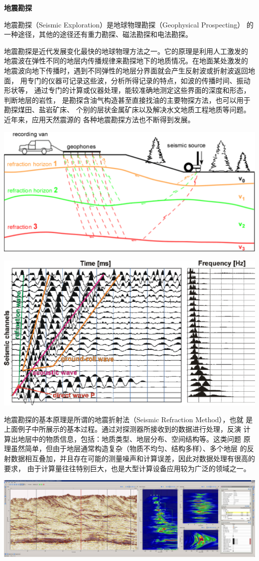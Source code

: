 \begin{shaded}
	{\bf 地震勘探}
	
	地震勘探（Seismic Exploration）是地球物理勘探（Geophysical Prospecting）
	的一种途径，其他的途径还有重力勘探、磁法勘探和电法勘探。
	
	地震勘探是近代发展变化最快的地球物理方法之一。它的原理是利用人工激发的
	地震波在弹性不同的地层内传播规律来勘探地下的地质情况。在地面某处激发的
	地震波向地下传播时，遇到不同弹性的地层分界面就会产生反射波或折射波返回地面，
	用专门的仪器可记录这些波，分析所得记录的特点，如波的传播时间、振动形状等，
	通过专门的计算或仪器处理，能较准确地测定这些界面的深度和形态，判断地层的岩性，
	是勘探含油气构造甚至直接找油的主要物探方法，也可以用于勘探煤田、盐岩矿床、
	个别的层状金属矿床以及解决水文地质工程地质等问题。近年来，应用天然震源的
	各种地震勘探方法也不断得到发展。
	
	\begin{center}
		\includegraphics[width=.6\textwidth]{./images/ch3/RS-reality.pdf}
		
		\includegraphics[width=.6\textwidth]{./images/ch3/RS-dataP-4.pdf}
	\end{center}
	
	地震勘探的基本原理是所谓的地震折射法（Seismic Refraction Method），也就
	是上面例子中所展示的基本过程。通过对探测器所接收到的数据进行处理，反演
	计算出地层中的物质信息，包括：地质类型、地层分布、空间结构等。这类问题
	原理虽然简单，但由于地层通常构造复杂（物质不均匀、结构多样）、多个地层
	的反射数据相互叠加，并且存在可能的测量噪声和计算误差，因此对数据处理有很高的要求，
	由于计算量往往特别巨大，也是大型计算设备应用较为广泛的领域之一。
	
	\begin{center}
		\includegraphics[width=.8\textwidth]{./images/ch3/RS-dataP-1.jpg}
		

\end{center}
\end{shaded}
